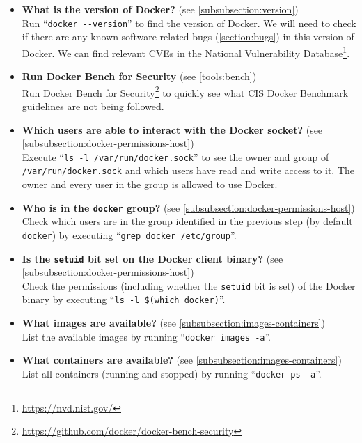 \begin{itemize}
    \item \textbf{What is the version of Docker?} (see \autoref{subsubsection:version})\\
    Run ``\lstinline{docker --version}'' to find the version of Docker. We will need to check if there are any known software related bugs (\autoref{section:bugs}) in this version of Docker. We can find relevant CVEs in the National Vulnerability Database\footnote{\url{https://nvd.nist.gov/}}.

    \item \textbf{Run Docker Bench for Security} (see \autoref{tools:bench})\\
        Run Docker Bench for Security\footnote{\url{https://github.com/docker/docker-bench-security}} to quickly see what CIS Docker Benchmark guidelines are not being followed.

    \item \textbf{Which users are able to interact with the Docker socket?} (see \autoref{subsubsection:docker-permissions-host})\\
    Execute ``\lstinline{ls -l /var/run/docker.sock}'' to see the owner and group of \lstinline{/var/run/docker.sock} and which users have read and write access to it. The owner and every user in the group is allowed to use Docker.

    \item \textbf{Who is in the \lstinline{docker} group?} (see \autoref{subsubsection:docker-permissions-host})\\
    Check which users are in the group identified in the previous step (by default \lstinline{docker}) by executing ``\lstinline{grep docker /etc/group}''.

    \item \textbf{Is the \lstinline{setuid} bit set on the Docker client binary?} (see \autoref{subsubsection:docker-permissions-host})\\
    Check the permissions (including whether the \lstinline{setuid} bit is set) of the Docker binary by executing ``\lstinline{ls -l $(which docker)}''.

    \item \textbf{What images are available?} (see \autoref{subsubsection:images-containers})\\
    List the available images by running ``\lstinline{docker images -a}''.

    \item \textbf{What containers are available?} (see \autoref{subsubsection:images-containers})\\
    List all containers (running and stopped) by running ``\lstinline{docker ps -a}''.


\end{itemize}
